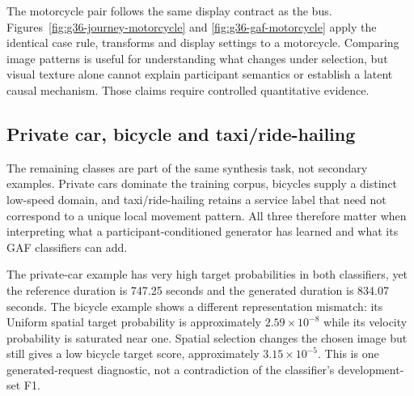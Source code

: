 The motorcycle pair follows the same display contract as the bus. Figures~\ref{fig:g36-journey-motorcycle} and \ref{fig:g36-gaf-motorcycle} apply the identical case rule, transforms and display settings to a motorcycle. Comparing image patterns is useful for understanding what changes under selection, but visual texture alone cannot explain participant semantics or establish a latent causal mechanism. Those claims require controlled quantitative evidence.

\subsection{Private car, bicycle and taxi/ride-hailing}
The remaining classes are part of the same synthesis task, not secondary examples. Private cars dominate the training corpus, bicycles supply a distinct low-speed domain, and taxi/ride-hailing retains a service label that need not correspond to a unique local movement pattern. All three therefore matter when interpreting what a participant-conditioned generator has learned and what its GAF classifiers can add.

The private-car example has very high target probabilities in both classifiers, yet the reference duration is 747.25 seconds and the generated duration is 834.07 seconds. The bicycle example shows a different representation mismatch: its Uniform spatial target probability is approximately $2.59\times10^{-8}$ while its velocity probability is saturated near one. Spatial selection changes the chosen image but still gives a low bicycle target score, approximately $3.15\times10^{-5}$. This is one generated-request diagnostic, not a contradiction of the classifier's development-set F1.

